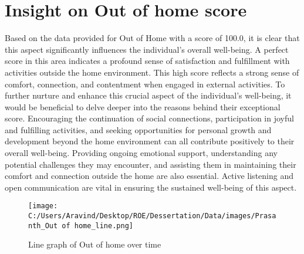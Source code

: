 \documentclass[10pt, a4paper]{article}%
\begin{document}
\section{Insight on Out of home score}%
\label{sec:InsightonOutofhomescore}%
Based on the data provided for Out of Home with a score of 100.0, it is clear that this aspect significantly influences the individual's overall well{-}being. A perfect score in this area indicates a profound sense of satisfaction and fulfillment with activities outside the home environment. This high score reflects a strong sense of comfort, connection, and contentment when engaged in external activities.\newline%
\newline%
To further nurture and enhance this crucial aspect of the individual's well{-}being, it would be beneficial to delve deeper into the reasons behind their exceptional score. Encouraging the continuation of social connections, participation in joyful and fulfilling activities, and seeking opportunities for personal growth and development beyond the home environment can all contribute positively to their overall well{-}being.\newline%
\newline%
Providing ongoing emotional support, understanding any potential challenges they may encounter, and assisting them in maintaining their comfort and connection outside the home are also essential. Active listening and open communication are vital in ensuring the sustained well{-}being of this aspect.%


\begin{figure}[H]%
\centering%
\texttt{[image: C:/Users/Aravind/Desktop/ROE/Dessertation/Data/images/Prasanth\_Out of home\_line.png]}%
\caption{Line graph of Out of home over time}%
\end{figure}

%
\end{document}
